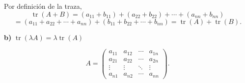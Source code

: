 \documentclass[a4paper,12pt]{article}
\begin{document}
\begin{ejercicio}[title=Ejercicio 7]
Por definición de la traza,
\[
\operatorname{tr}(A+B)
= (a_{11}+b_{11}) + (a_{22}+b_{22}) + \cdots + (a_{nn}+b_{nn})
\]
\[
= (a_{11}+a_{22}+\cdots+a_{nn}) + (b_{11}+b_{22}+\cdots+b_{nn})
= \boxed{\operatorname{tr}(A)+\operatorname{tr}(B)}.
\]

\textbf{b)} $\operatorname{tr}(\lambda A) = \lambda \operatorname{tr}(A)$

\[
A =
\begin{pmatrix}
a_{11} & a_{12} & \cdots & a_{1n} \\
a_{21} & a_{22} & \cdots & a_{2n} \\
\vdots & \vdots & \ddots & \vdots \\
a_{n1} & a_{n2} & \cdots & a_{nn}
\end{pmatrix}.
\]

\end{ejercicio}
\end{document}
